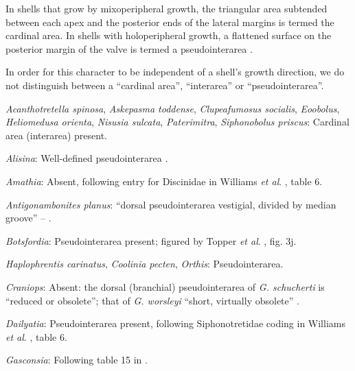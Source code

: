 \documentclass[openany]{book}
\theoremstyle{definition}
\theoremstyle{definition}
\theoremstyle{definition}
\theoremstyle{remark}
\begin{document}
In shells that grow by mixoperipheral growth, the triangular area
subtended between each apex and the posterior ends of the lateral
margins is termed the cardinal area. In shells with holoperipheral
growth, a flattened surface on the posterior margin of the valve is
termed a pseudointerarea
\citep[paraphrasing][]{Williams1997Introduction}.

In order for this character to be independent of a shell's growth
direction, we do not distinguish between a ``cardinal area'',
``interarea'' or ``pseudointerarea''.

\hypertarget{Acanthotretella_spinosa-coding-85}{}
\emph{Acanthotretella spinosa}, \emph{Askepasma toddense},
\emph{Clupeafumosus socialis}, \emph{Eoobolus}, \emph{Heliomedusa
orienta}, \emph{Nisusia sulcata}, \emph{Paterimitra}, \emph{Siphonobolus
priscus}: Cardinal area (interarea) present.

\hypertarget{Alisina-coding-85}{}
\emph{Alisina}: Well-defined pseudointerarea
\citep[p153]{Williams2000LinguliformeaCraniiformea}.

\hypertarget{Amathia-coding-85}{}
\emph{Amathia}: Absent, following entry for Discinidae in Williams
\emph{et al}. \citeyearpar{Williams2000LinguliformeaCraniiformea}, table
6.

\hypertarget{Antigonambonites_planus-coding-85}{}
\emph{Antigonambonites planus}: ``dorsal pseudointerarea vestigial,
divided by median groove'' --
\citet{Williams2000LinguliformeaCraniiformea}.

\hypertarget{Botsfordia-coding-85}{}
\emph{Botsfordia}: Pseudointerarea present; figured by Topper \emph{et
al}. \citeyearpar{Topper2013Reappraisalof}, fig. 3j.

\hypertarget{Coolinia_pecten-coding-85}{}
\emph{Haplophrentis carinatus}, \emph{Coolinia pecten}, \emph{Orthis}:
Pseudointerarea.

\hypertarget{Craniops-coding-85}{}
\emph{Craniops}: Absent: the dorsal (branchial) pseudointerarea of
\emph{G. schucherti} is ``reduced or obsolete''; that of \emph{G.
worsleyi} ``short, virtually obsolete'' \citep{Hanken1985Thetaxonomy}.

\hypertarget{Dailyatia-coding-85}{}
\emph{Dailyatia}: Pseudointerarea present, following Siphonotretidae
coding in Williams \emph{et al}.
\citeyearpar{Williams2000LinguliformeaCraniiformea}, table 6.

\hypertarget{Gasconsia-coding-85}{}
\emph{Gasconsia}: Following table 15 in
\citet{Williams2000LinguliformeaCraniiformea}.
\end{document}
